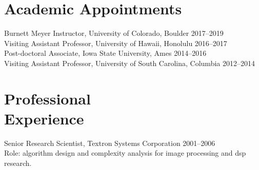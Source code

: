 \documentclass[margin,line]{resume}
\begin{document}
\begin{resume}
    \vspace{-1mm}
    \section{\mysidestyle Academic Appointments}
    Burnett Meyer Instructor, University of Colorado, Boulder \hfill  2017--2019 \\[3pt]
    Visiting Assistant Professor, University of Hawaii, Honolulu \hfill  2016--2017 \\[3pt]
    Post-doctoral Associate, Iowa State University, Ames \hfill  2014--2016 \\[3pt]
    Visiting Assistant Professor, University of South Carolina, Columbia \hfill  2012--2014


    \vspace{-1mm}
    \section{\mysidestyle Professional\\Experience}
    
    Senior Research Scientist, Textron Systems Corporation  \hfill 2001--2006\\
    Role: algorithm design and complexity analysis for image processing and dsp research.


    

\end{resume}
\end{document}
